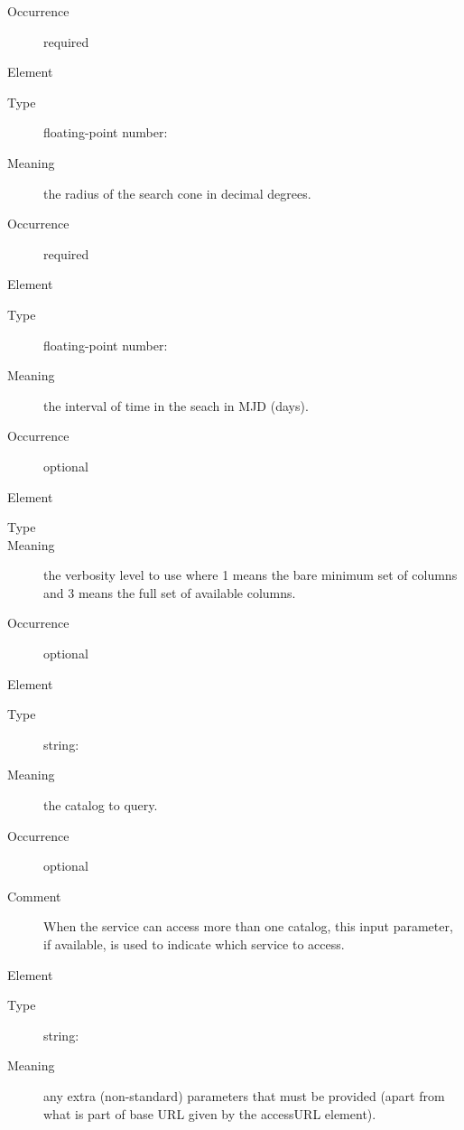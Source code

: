 \documentclass[11pt,a4paper]{ivoa} 
\begin{document}
\begin{generated}
\begin{bigdescription}
\begin{description}
\item[Occurrence] required

\end{description} \item[Element \xmlel{sr}] \begin{description}
\item[Type] floating-point number:  \item[Meaning] the
radius of the search cone in decimal degrees.
               
\item[Occurrence] required

\end{description}

\item[Element \xmlel{time}] \begin{description} \item[Type]
floating-point number:  \item[Meaning] the interval of
time in the seach in MJD (days).  \item[Occurrence] optional

\end{description}


\item[Element \xmlel{verb}] \begin{description} \item[Type]
 \item[Meaning] the verbosity level to use
where 1 means the bare minimum set of columns and 3 means the full set
of available columns.
               
\item[Occurrence] optional 

\end{description} \item[Element \xmlel{catalog}] \begin{description}
\item[Type] string:  \item[Meaning] the catalog to
query.  
               
\item[Occurrence] optional \item[Comment] When the service can access
more than one catalog, this input parameter, if available, is used to
indicate which service to access.
               

\end{description} \item[Element \xmlel{extras}] \begin{description}
\item[Type] string:  \item[Meaning] any extra
(non-standard) parameters that must be provided (apart from what is part
of base URL given by the accessURL element).
               

\end{description}
\end{bigdescription}
\end{generated}
\end{document}
